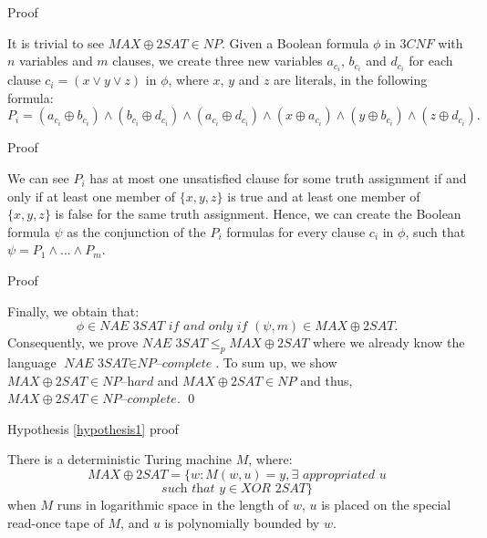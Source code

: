 \documentclass[11pt]{beamer}
\begin{document}
\begin{frame}{Proof}

It is trivial to see $MAX\oplus2SAT \in NP$. Given a Boolean formula $\phi$ in $3CNF$ with $n$ variables and $m$ clauses, we create three new variables $a_{c_{i}}$, $b_{c_{i}}$ and $d_{c_{i}}$ for each clause $c_{i} = (x \vee y \vee z)$ in $\phi$, where $x$, $y$ and $z$ are literals, in the following formula:
\[P_{i} = (a_{c_{i}} \oplus b_{c_{i}}) \wedge (b_{c_{i}} \oplus d_{c_{i}}) \wedge (a_{c_{i}} \oplus d_{c_{i}}) \wedge (x \oplus a_{c_{i}}) \wedge (y \oplus b_{c_{i}}) \wedge (z \oplus d_{c_{i}}).\]

\end{frame}

\begin{frame}{Proof}

We can see $P_{i}$ has at most one unsatisfied clause for some truth assignment if and only if at least one member of $\{x,y,z\}$ is true and at least one member of $\{x,y,z\}$ is false for the same truth assignment. Hence, we can create the Boolean formula $\psi$ as the conjunction of the $P_{i}$ formulas for every clause $c_{i}$ in $\phi$, such that $\psi = P_{1} \wedge \ldots \wedge P_{m}$.

\end{frame}

\begin{frame}{Proof}

Finally, we obtain that:
\[\phi \in \textit{NAE 3SAT} \textit{ if and only if } (\psi, m) \in MAX\oplus2SAT.\]
Consequently, we prove $\textit{NAE 3SAT} \leq_{p} MAX\oplus2SAT$ where we already know the language $\textit{NAE 3SAT} \in \textit{NP--complete}$. To sum up, we show $MAX\oplus2SAT \in \textit{NP--hard}$ and $MAX\oplus2SAT \in NP$ and thus, $MAX\oplus2SAT \in \textit{NP--complete}$. \qed

\end{frame}

\begin{frame}{Hypothesis \ref{hypothesis1} proof}

\begin{theorem}
\label{proof}
There is a deterministic Turing machine $M$, where:
\[MAX\oplus2SAT = \{w: M(w, u) = y, \exists \textit{ appropriated } u\]
\[\textit{such that } y \in \textit{XOR 2SAT}\}\]
when $M$ runs in logarithmic space in the length of $w$, $u$ is placed on the special read-once tape of $M$, and $u$ is polynomially bounded by $w$.
\end{theorem}

\end{frame}
\end{document}
